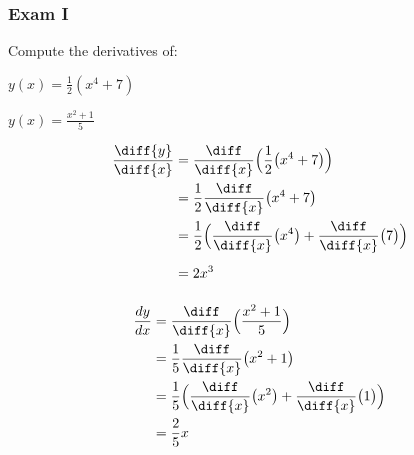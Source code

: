 \documentclass[crop=false,class=book,oneside]{standalone}                      %
\begin{document}
        \subsubsection{Exam I}
            \begin{problem}
                Compute the derivatives of:
                \begin{enumerate}[label=(\alph*)]
                    \begin{multicols}{2}
                        \item $y(x)=\frac{1}{2}(x^{4}+7)$
                        \item $y(x)=\frac{x^{2}+1}{5}$
                    \end{multicols}
                \end{enumerate}
            \end{problem}
            \begin{solution}
                \par\hfill\par
                \begin{minipage}[b]{.49\textwidth}
                    \centering
                    \begin{align*}
                        \frac{\diff{y}}{\diff{x}}
                        &=\frac{\diff}{\diff{x}}\Big(
                            \frac{1}{2}\big(x^{4}+7\big)
                        \Big)\\
                        &=\frac{1}{2}\frac{\diff}{\diff{x}}
                            \big(x^{4}+7\big)\\
                        &=\frac{1}{2}\Big(
                            \frac{\diff}{\diff{x}}
                            \big(x^{4}\big)+
                            \frac{\diff}{\diff{x}}
                            \big(7\big)\Big)
                        \vphantom{\frac{\diff}{\diff}}\\
                        &=2x^{3}\vphantom{\frac{\diff}{\diff}}
                    \end{align*}
                \end{minipage}
                \hfill
                \vline
                \begin{minipage}[b]{.49\textwidth}
                    \centering
                    \begin{align*}
                        \frac{dy}{dx}
                        &=\frac{\diff}{\diff{x}}
                            \Big(\frac{x^{2}+1}{5}\Big)\\
                        &=\frac{1}{5}\frac{\diff}{\diff{x}}
                            \big(x^{2}+1\big)\\
                        &=\frac{1}{5}\Big(
                            \frac{\diff}{\diff{x}}
                            \big(x^{2}\big)+
                            \frac{\diff}{\diff{x}}
                            \big(1\big)\Big)\\
                        &=\frac{2}{5}x
                    \end{align*}
                \end{minipage}
            \end{solution}
\end{document}
